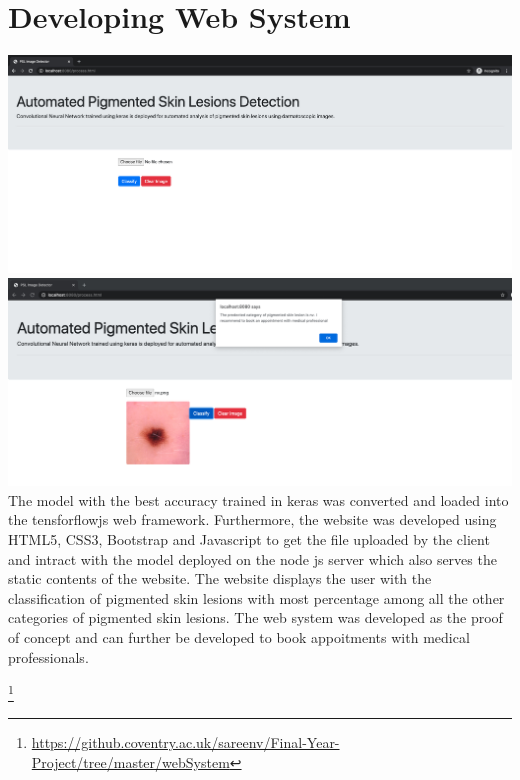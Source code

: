 \section{Developing Web System}
\includegraphics[width=\textwidth]{Images/web.png}
\includegraphics[width=\textwidth]{Images/web2.png}
The model with the best accuracy trained in keras was converted and loaded into the
tensforflowjs web framework. Furthermore, the website was developed using HTML5, CSS3, 
Bootstrap and Javascript to get the file uploaded by the client and intract with the 
model deployed on the node js server which also serves the static contents of the website.
The website displays the user with the classification of pigmented skin lesions with most 
percentage among all the other categories of pigmented skin lesions. The web system was developed as 
the proof of concept and can further be developed to book appoitments with medical 
professionals.

\footnote{\url{https://github.coventry.ac.uk/sareenv/Final-Year-Project/tree/master/webSystem}}
